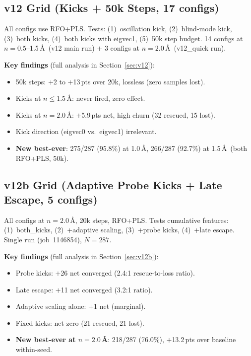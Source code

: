 \documentclass[11pt,a4paper]{article}
\theoremstyle{definition}
\begin{document}
\subsection{v12 Grid (Kicks + 50k Steps, 17 configs)}

All configs use RFO+PLS.  Tests: (1)~oscillation kick, (2)~blind-mode
kick, (3)~both kicks, (4)~both kicks with eigvec1, (5)~50k step budget.
14 configs at $n=0.5$--1.5\,\AA\ (v12 main run) $+$ 3 configs at
$n=2.0$\,\AA\ (v12\_quick run).

\textbf{Key findings} (full analysis in Section~\ref{sec:v12}):
\begin{itemize}[nosep]
  \item 50k steps: $+$2 to $+$13\,pts over 20k, lossless (zero samples lost).
  \item Kicks at $n \leq 1.5$\,\AA: never fired, zero effect.
  \item Kicks at $n=2.0$\,\AA: $+$5.9\,pts net, high churn (32 rescued, 15 lost).
  \item Kick direction (eigvec0 vs.\ eigvec1) irrelevant.
  \item \textbf{New best-ever}: 275/287 (95.8\%) at 1.0\,\AA, 266/287
    (92.7\%) at 1.5\,\AA\ (both RFO+PLS, 50k).
\end{itemize}

\subsection{v12b Grid (Adaptive Probe Kicks + Late Escape, 5 configs)}

All configs at $n=2.0$\,\AA, 20k steps, RFO+PLS.  Tests cumulative
features: (1)~both\_kicks, (2)~+adaptive scaling, (3)~+probe kicks,
(4)~+late escape.  Single run (job~1146854), $N=287$.

\textbf{Key findings} (full analysis in Section~\ref{sec:v12b}):
\begin{itemize}[nosep]
  \item Probe kicks: $+$26 net converged (2.4:1 rescue-to-loss ratio).
  \item Late escape: $+$11 net converged (3.2:1 ratio).
  \item Adaptive scaling alone: $+$1 net (marginal).
  \item Fixed kicks: net zero (21 rescued, 21 lost).
  \item \textbf{New best-ever at $n=2.0$\,\AA}: 218/287 (76.0\%),
    $+$13.2\,pts over baseline within-seed.
\end{itemize}
\end{document}
